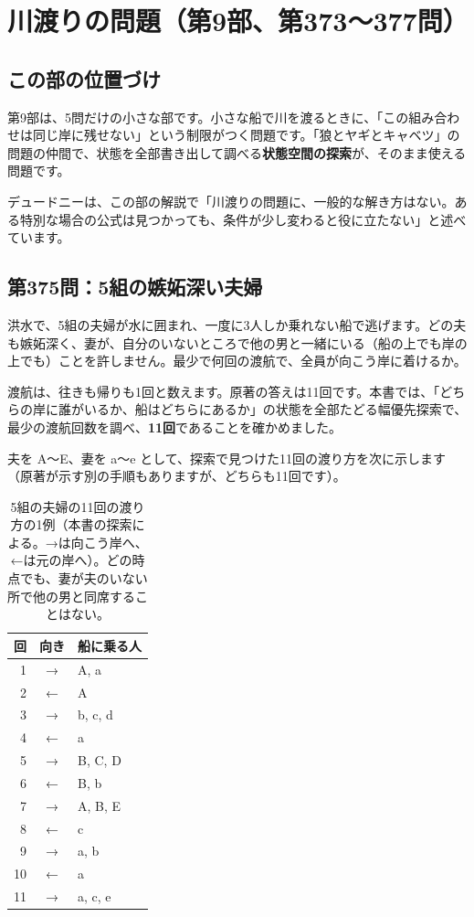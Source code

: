 \documentclass[a4paper,11pt,openany]{ltjsbook}
\begin{document}
\chapter{川渡りの問題（第9部、第373〜377問）}

\section{この部の位置づけ}

第9部は、5問だけの小さな部です。小さな船で川を渡るときに、「この組み合わせは同じ岸に残せない」という制限がつく問題です。「狼とヤギとキャベツ」の問題の仲間で、状態を全部書き出して調べる\textbf{状態空間の探索}が、そのまま使える問題です。

デュードニーは、この部の解説で「川渡りの問題に、一般的な解き方はない。ある特別な場合の公式は見つかっても、条件が少し変わると役に立たない」と述べています。

\section{第375問：5組の嫉妬深い夫婦}

洪水で、5組の夫婦が水に囲まれ、一度に3人しか乗れない船で逃げます。どの夫も嫉妬深く、妻が、自分のいないところで他の男と一緒にいる（船の上でも岸の上でも）ことを許しません。最少で何回の渡航で、全員が向こう岸に着けるか。

渡航は、往きも帰りも1回と数えます。原著の答えは11回です。本書では、「どちらの岸に誰がいるか、船はどちらにあるか」の状態を全部たどる幅優先探索で、最少の渡航回数を調べ、\textbf{11回}であることを確かめました。

夫を A〜E、妻を a〜e として、探索で見つけた11回の渡り方を次に示します（原著が示す別の手順もありますが、どちらも11回です）。

\begin{table}[htbp]
\centering
\begin{tabular}{rcl}
\toprule
回 & 向き & 船に乗る人\\
\midrule
1 & → & A, a\\
2 & ← & A\\
3 & → & b, c, d\\
4 & ← & a\\
5 & → & B, C, D\\
6 & ← & B, b\\
7 & → & A, B, E\\
8 & ← & c\\
9 & → & a, b\\
10 & ← & a\\
11 & → & a, c, e\\
\bottomrule
\end{tabular}
\caption{5組の夫婦の11回の渡り方の1例（本書の探索による。→は向こう岸へ、←は元の岸へ）。どの時点でも、妻が夫のいない所で他の男と同席することはない。}
\end{table}
\end{document}
